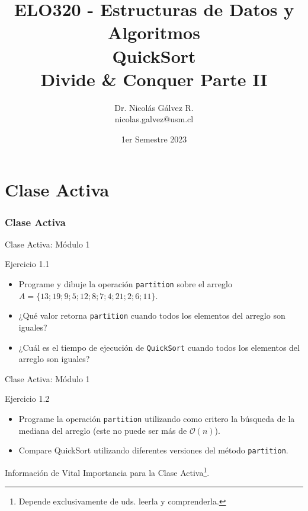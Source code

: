 \documentclass{beamer}
\title{ELO320 - Estructuras de Datos y Algoritmos\\QuickSort\\{\small Divide \& Conquer Parte II}}
\author{Dr. Nicolás Gálvez R.\\{\small nicolas.galvez@usm.cl}}
\institute{Ing. Civil Telemática - Departamento de Electrónica}
\date{1er Semestre 2023}
\begin{document}
\frame{\titlepage}

%
%

\part{Clase Activa}
\section{Clase Activa}
\begin{frame}[fragile]{Clase Activa: Módulo 1}
\begin{exampleblock}{Ejercicio 1.1}
\begin{itemize}
\item Programe y dibuje la operación \texttt{partition} sobre el arreglo $A = \{13; 19; 9; 5; 12; 8; 7; 4; 21; 2; 6; 11\}$.
\item ¿Qué valor retorna \texttt{partition} cuando todos los elementos del arreglo son iguales?
\item ¿Cuál es el tiempo de ejecución de \texttt{QuickSort} cuando todos los elementos del arreglo son iguales?
\end{itemize}
\end{exampleblock}
\end{frame}


\begin{frame}[fragile]{Clase Activa: Módulo 1}
\begin{exampleblock}{Ejercicio 1.2}
\begin{itemize}
\item Programe la operación \texttt{partition} utilizando como critero la búsqueda de la mediana del arreglo (este no puede ser más de $\mathcal{O}(n)$).
\item Compare QuickSort utilizando diferentes versiones del método \texttt{partition}.
\end{itemize}
\end{exampleblock}
\end{frame}

\begin{frame}
\centering \Huge Información de Vital Importancia para la Clase Activa\footnote{Depende exclusivamente de uds. leerla y comprenderla.}.
\end{frame}
\end{document}
